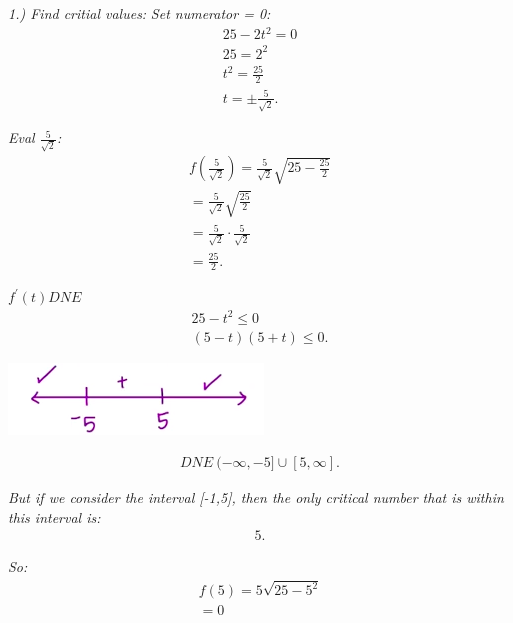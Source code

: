\documentclass{report}
\begin{document}
    \bigbreak \noindent 
    \textit{1.) Find critial values:} 
    \bigbreak \noindent 
    \textit{Set numerator = 0:}
    \begin{align*}
      25-2t^{2}=  0 \\ 
      25 = 2^{2} \\
      t^{2} = \frac{25}{2} \\
      t = \pm \frac{5}{\sqrt{2}}
    .\end{align*}

    \bigbreak \noindent 

    \bigbreak \noindent 
    \textit{Eval $\frac{5}{\sqrt{2}}$:}
    \begin{align*}
      f(\frac{5}{\sqrt{2}}) = \frac{5}{\sqrt{2}}\sqrt{25-\frac{25}{2}} \\
      = \frac{5}{\sqrt{2}}\sqrt{\frac{25}{2}} \\
      = \frac{5}{\sqrt{2}} \cdot \frac{5}{\sqrt{2}} \\
      = \boxed{\frac{25}{2}}
    .\end{align*}

    \bigbreak \noindent 
    \textit{$f^{\prime}(t) DNE$}
    \begin{align*}
      25-t^{2} \leq 0 \\ 
      (5 - t)(5+t) \leq 0
    .\end{align*}

   \bigbreak \noindent 
   \begin{center}
     \includegraphics[scale=1]{ ./images/3.png }
   \end{center}

   \bigbreak \noindent 
   \begin{align*}
     DNE\ (-\infty, -5] \cup [5, \infty]
   .\end{align*}

   \bigbreak \noindent 
   \textit{But if we consider the interval [-1,5], then the only critical number that is within this interval is:}
   \begin{align*}
     5
   .\end{align*}

   \bigbreak \noindent
   \textit{So:}
   \begin{align*}
     f(5) = 5\sqrt{25-5^{2}} \\
     = \boxed{0}
   \end{align*}
\end{document}
